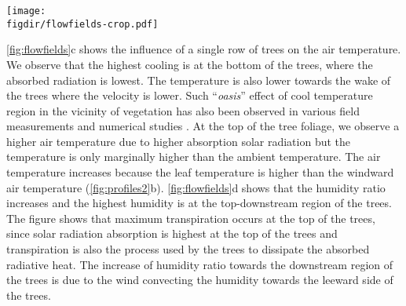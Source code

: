 
	\begin{sidewaysfigure}[p]
	\centering
	\texttt{[image: \\figdir/flowfields-crop.pdf]}
	\caption{Flow field past a single row of trees for the reference case with domain described in \cref{fig:domain}, with $r_s=r_{\textit{s,min}}$ and environmental and tree properties tabulated in \cref{tab:environmentalcond,tab:plantcond}, respectively.  Normalized velocity $\tavg{\mvec{u}}/U_{\textit{ref}}$,  turbulence intensity $\textit{TI}=(2/3\,k)/\tavg{\mvec{u}}$  air temperature $T$ ($^{\circ}$C) and  humidity ratio $w$ (g\,kg$^{-1}$).}
	\label{fig:flowfields}
	\end{sidewaysfigure}

\cref{fig:flowfields}c shows the influence of a single row of trees on the air temperature. We observe that the highest cooling is at the bottom of the trees, where the absorbed radiation is lowest. The temperature is also lower towards the wake of the trees where the velocity is lower. Such ``\textit{oasis}'' effect of cool temperature region in the vicinity of vegetation has also been observed in various field measurements \citep{Kurn1994, Taha1997, Wong2003} and numerical studies \citep{Dimoudi2003,Gromke2011}. At the top of the tree foliage, we observe a higher air temperature due to higher absorption solar radiation but the temperature is only marginally higher than the ambient temperature. The air temperature increases because the leaf temperature is higher than the windward air temperature (\cref{fig:profiles2}b). \cref{fig:flowfields}d shows that the humidity ratio increases and the highest humidity is at the top-downstream region of the trees. The figure shows that maximum transpiration occurs at the top of the trees, since solar radiation absorption is highest at the top of the trees and transpiration is also the process used by the trees to dissipate the absorbed radiative heat. The increase of humidity ratio towards the downstream region of the trees is due to the wind convecting the humidity towards the leeward side of the trees.

